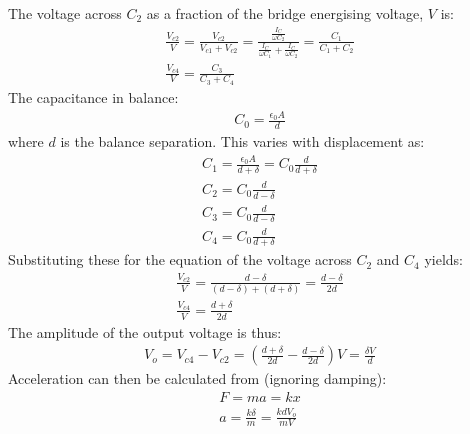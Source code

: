 \documentclass[class=report, crop=false, 12pt,a4paper]{standalone}
\begin{document}
The voltage across $C_2$ as a fraction of the bridge energising voltage, $V$ is:
\begin{gather}
  \frac{V_{c2}}{V} = \frac{V_{c2}}{V_{c1}+V_{c2}} = \frac{\frac{I_C}{\omega C_2}}{\frac{I_C}{\omega C_1}+\frac{I_C}{\omega C_2}} = \frac{C_1}{C_1+C_2} \\[10pt]
  \frac{V_{c4}}{V} = \frac{C_3}{C_3+C_4}
\end{gather}
The capacitance in balance: 
\begin{gather}
  C_0 = \frac{\epsilon_0 A}{d}
\end{gather}
where $d$ is the balance separation. This varies with displacement as:
\begin{gather}
  C_1 = \frac{\epsilon_0 A}{d+\delta} = C_0\frac{d}{d+\delta} \\
  C_2 = C_0\frac{d}{d-\delta} \\
  C_3 = C_0\frac{d}{d-\delta} \\
  C_4 = C_0\frac{d}{d+\delta}
\end{gather}
Substituting these for the equation of the voltage across $C_2$ and $C_4$ yields:
\begin{gather}
  \frac{V_{c2}}{V} = \frac{d-\delta}{(d-\delta)+(d+\delta)} = \frac{d-\delta}{2d} \\[10pt]
  \frac{V_{c4}}{V} = \frac{d+\delta}{2d}
\end{gather}
The amplitude of the output voltage is thus:
\begin{gather}
  V_o = V_{c4}-V_{c2} = \left(\frac{d+\delta}{2d}-\frac{d-\delta}{2d}\right)V = \frac{\delta V}{d}
\end{gather}
Acceleration can then be calculated from (ignoring damping): 
\begin{gather}
  F = ma = kx \\
  a = \frac{k\delta}{m} = \frac{kdV_o}{mV}
\end{gather}
\end{document}
